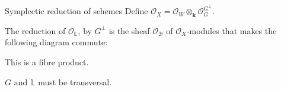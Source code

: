     
    \begin{frame}{Symplectic reduction of schemes}
    Define \( \mathcal{O}_X = \mathcal{O}_W \otimes_{\mathbf{k}} \mathcal{O}_G^{G^\perp}\).
    
    \begin{defn}
    The reduction of \( \mathcal{O}_{\mathbb{L}} \), by \( G^{\perp}\) is the sheaf \( \mathcal{O}_\mathcal{B}\) of \( \mathcal{O}_X\)-modules that makes the following diagram commute:
    \end{defn}

    \begin{center}
    \end{center}
    This is a fibre product.
    
    \( G\) and \(\mathbb{L}\) must be transversal.
    \end{frame}
    
